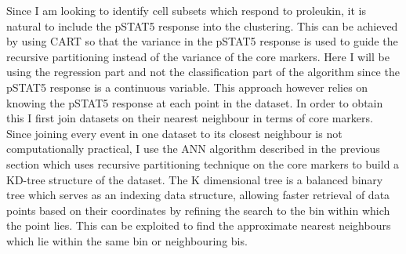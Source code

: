Since I am looking to identify cell subsets which respond to proleukin, it is natural to include the pSTAT5 response
into the clustering.
This can be achieved by using \acrfull{CART} so that the variance in the pSTAT5 response is used to guide the recursive
partitioning instead of the variance of the core markers.
Here I will be using the regression part and not the classification part of the algorithm since the pSTAT5 response
is a continuous variable.
This approach however relies on knowing the pSTAT5 response at each point in the dataset.
In order to obtain this I first join datasets on their nearest neighbour in terms of core markers.
Since joining every event in one dataset to its closest neighbour is not computationally practical,
I use the \gls{ANN} algorithm described in the previous section which uses recursive partitioning technique on the core markers
to build a KD-tree structure of the dataset.
The K dimensional tree is a balanced binary tree which serves as an indexing data structure,
allowing faster retrieval of data points based on their coordinates
by refining the search to the bin within which the point lies.
This can be exploited to find the approximate nearest neighbours which lie within the same bin
or neighbouring bis.

